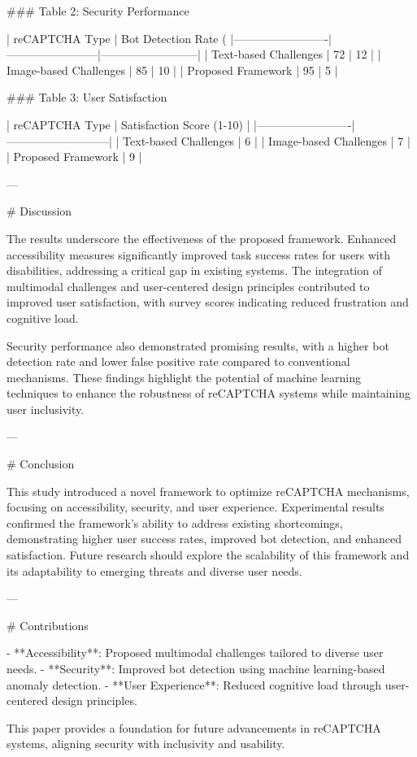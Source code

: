 ### Table 2: Security Performance  

| reCAPTCHA Type         | Bot Detection Rate (%
|-------------------------|------------------------|--------------------------|
| Text-based Challenges  | 72                     | 12                       |
| Image-based Challenges | 85                     | 10                       |
| Proposed Framework     | 95                     | 5                        |

### Table 3: User Satisfaction  

| reCAPTCHA Type         | Satisfaction Score (1-10) |
|-------------------------|---------------------------|
| Text-based Challenges  | 6                         |
| Image-based Challenges | 7                         |
| Proposed Framework     | 9                         |

---

# Discussion  

The results underscore the effectiveness of the proposed framework. Enhanced accessibility measures significantly improved task success rates for users with disabilities, addressing a critical gap in existing systems. The integration of multimodal challenges and user-centered design principles contributed to improved user satisfaction, with survey scores indicating reduced frustration and cognitive load.

Security performance also demonstrated promising results, with a higher bot detection rate and lower false positive rate compared to conventional mechanisms. These findings highlight the potential of machine learning techniques to enhance the robustness of reCAPTCHA systems while maintaining user inclusivity.

---

# Conclusion  

This study introduced a novel framework to optimize reCAPTCHA mechanisms, focusing on accessibility, security, and user experience. Experimental results confirmed the framework’s ability to address existing shortcomings, demonstrating higher user success rates, improved bot detection, and enhanced satisfaction. Future research should explore the scalability of this framework and its adaptability to emerging threats and diverse user needs.

---

# Contributions  

- **Accessibility**: Proposed multimodal challenges tailored to diverse user needs.  
- **Security**: Improved bot detection using machine learning-based anomaly detection.  
- **User Experience**: Reduced cognitive load through user-centered design principles.  

This paper provides a foundation for future advancements in reCAPTCHA systems, aligning security with inclusivity and usability.